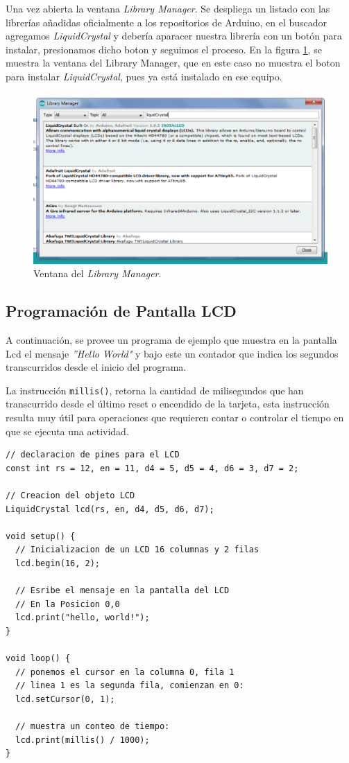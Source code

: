 \documentclass[letterpaper, 10pt]{report}
\begin{document}
Una vez abierta la ventana \emph{Library Manager}. Se despliega un listado con las librerías añadidas oficialmente a los repositorios de Arduino, en el buscador agregamos \emph{LiquidCrystal} y debería aparacer nuestra librería con un botón para instalar, presionamos dicho boton y seguimos el proceso. En la figura \ref{libMan}, se muestra la ventana del Library Manager, que en este caso no muestra el boton para instalar \emph{LiquidCrystal}, pues ya está instalado en ese equipo.

\begin{figure}[h]
\centering
\includegraphics[scale=0.5]{libManager.png}
\caption{Ventana del \emph{Library Manager}.\label{libMan}}
\end{figure}

\subsection{Programación de Pantalla LCD}\label{lcdprog}

A continuación, se provee un programa de ejemplo que muestra en la pantalla Lcd el mensaje \emph{''Hello World"} y bajo este un contador que indica los segundos transcurridos desde el inicio del programa.

La instrucción \texttt{millis()}, retorna la cantidad de milisegundos que han transcurrido desde el último reset o encendido de la tarjeta, esta instrucción resulta muy útil para operaciones que requieren contar o controlar el tiempo en que se ejecuta una actividad.
\\
\begin{lstlisting}[style=myArduino]
// declaracion de pines para el LCD
const int rs = 12, en = 11, d4 = 5, d5 = 4, d6 = 3, d7 = 2;

// Creacion del objeto LCD
LiquidCrystal lcd(rs, en, d4, d5, d6, d7);

void setup() {
  // Inicializacion de un LCD 16 columnas y 2 filas
  lcd.begin(16, 2);
  
  // Esribe el mensaje en la pantalla del LCD
  // En la Posicion 0,0
  lcd.print("hello, world!");
}

void loop() {
  // ponemos el cursor en la columna 0, fila 1
  // linea 1 es la segunda fila, comienzan en 0:
  lcd.setCursor(0, 1);
  
  // muestra un conteo de tiempo:
  lcd.print(millis() / 1000);
}
\end{lstlisting}
\end{document}
